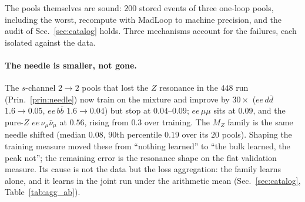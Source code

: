\documentclass[11pt]{article}
\begin{document}
The pools themselves are sound: $200$ stored events of three one-loop pools, including the
worst, recompute with MadLoop to machine precision, and the audit of Sec.~\ref{sec:catalog}
holds. Three mechanisms account for the failures, each isolated against the data.

\paragraph{The needle is smaller, not gone.} The $s$-channel $2\to2$ pools that lost the $Z$
resonance in the $448$ run (Prin.~\ref{prin:needle}) now train on the mixture and improve by
$30\times$ ($ee\,d\bar d$ $1.6\to0.05$, $ee\,b\bar b$ $1.6\to0.04$) but stop at
$0.04$--$0.09$; $ee\,\mu\mu$ sits at $0.09$, and the pure-$Z$ $ee\,\nu_\mu\bar\nu_\mu$ at
$0.56$, rising from $0.3$ over training. The $M_Z$ family is the same needle shifted
(median $0.08$, $90$th percentile $0.19$ over its $20$ pools). Shaping the training measure moved these from
``nothing learned'' to ``the bulk learned, the peak not''; the remaining error is the
resonance shape on the flat validation measure. Its cause is not the data but the loss
aggregation: the family learns alone, and it learns in the joint run under the arithmetic mean
(Sec.~\ref{sec:catalog}, Table~\ref{tab:agg_ab}).
\end{document}
